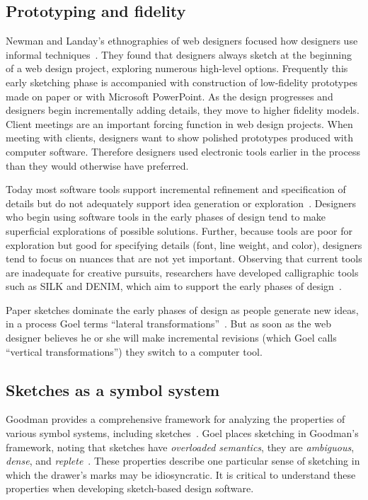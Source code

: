 \subsection{Prototyping and fidelity}
\label{sec:traditional-prototyping}

Newman and Landay's ethnographies of web designers focused how
designers use informal techniques~\cite{newman-web-designers}. They
found that designers always sketch at the beginning of a web design
project, exploring numerous high-level options. Frequently this early
sketching phase is accompanied with construction of low-fidelity
prototypes made on paper or with Microsoft PowerPoint. As the design
progresses and designers begin incrementally adding details, they move
to higher fidelity models. Client meetings are an important forcing
function in web design projects. When meeting with clients, designers
want to show polished prototypes produced with computer
software. Therefore designers used electronic tools earlier in the
process than they would otherwise have preferred.

Today most software tools support incremental refinement and
specification of details but do not adequately support idea generation
or exploration~\cite{terry-creative-ui}. Designers who begin using
software tools in the early phases of design tend to make superficial
explorations of possible solutions. Further, because tools are poor
for exploration but good for specifying details (font, line weight,
and color), designers tend to focus on nuances that are not yet
important. Observing that current tools are inadequate for creative
pursuits, researchers have developed calligraphic tools such as SILK
and DENIM, which aim to support the early phases of
design~\cite{landay-silk,lin-denim}.

Paper sketches dominate the early phases of design as people generate
new ideas, in a process Goel terms ``lateral
transformations''~\cite{goel-sketches-of-thought}. But as soon as the
web designer believes he or she will make incremental revisions (which
Goel calls ``vertical transformations'') they switch to a computer
tool.

\subsection{Sketches as a symbol system}



Goodman provides a comprehensive framework for analyzing the
properties of various symbol systems, including
sketches~\cite{goodman-symbols}. Goel places sketching in Goodman's
framework, noting that sketches have \textit{overloaded semantics},
they are \textit{ambiguous}, \textit{dense}, and
\textit{replete}~\cite{goel-sketches-of-thought}. These properties
describe one particular sense of sketching in which the drawer's marks
may be idiosyncratic. It is critical to understand these properties
when developing sketch-based design software.

